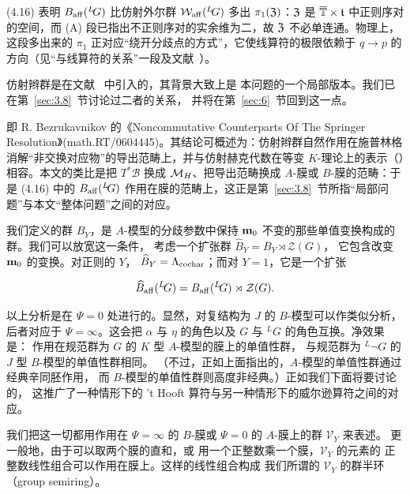 \begin{yizhu}[易错点](4.16) 表明 $B_{\rm aff}({}^L\neg G)$ 比仿射外尔群 $\AffWeyl({}^L\neg G)$ 多出 $\pi_1(\eurz)$：$\eurz$ 是 $\bar\TT\times\mathfrak t$ 中正则序对的空间，而 (A) 段已指出不正则序对的实余维为二，故 $\eurz$ 不必单连通。物理上，这段多出来的 $\pi_1$ 正对应“绕开分歧点的方式”，它使线算符的极限依赖于 $q\to p$ 的方向（见“与线算符的关系”一段及文献~\cite{ref75}）。\end{yizhu}

仿射辫群是在文献~\cite{ref29} 中引入的，其背景大致上是
本问题的一个局部版本。我们已在第~\ref{sec:3.8}~节讨论过二者的关系，
并将在第~\ref{sec:6}~节回到这一点。

\begin{yizhu}[含糊点拨]\cite{ref29} 即 R. Bezrukavnikov 的《Noncommutative Counterparts Of The Springer Resolution》(math.RT/0604445)。其结论可概述为：仿射辫群自然作用在施普林格消解“非交换对应物”的导出范畴上，并与仿射赫克代数在等变 $K$-理论上的表示（\cite{ref27,ref28}）相容。本文的类比是把 $T^*\mathcal B$ 换成 $\MH$、把导出范畴换成 $A$-膜或 $B$-膜的范畴：于是 (4.16) 中的 $B_{\rm aff}({}^L\neg G)$ 作用在膜的范畴上，这正是第~\ref{sec:3.8}~节所指“局部问题”与本文“整体问题”之间的对应。\end{yizhu}

我们定义的群 $B_Y$，是 $A$-模型的分歧参数中保持
${\bf m}_0$ 不变的那些单值变换构成的群。我们可以放宽这一条件，
考虑一个扩张群 $\hat B_Y=B_Y\rtimes {\mathcal Z}(G)$，
它包含改变 ${\bf m}_0$ 的变换。对正则的 $Y$，
$\hat{B}_Y=\Lambda_\cochar$；而对 $Y=1$，它是一个扩张

\setcounter{equation}{16}
\begin{equation}\label{eq:4.17}
  \hat{B}_{\rm aff}({}^L\neg G)= B_{\rm aff}(^L\neg
G)\rtimes {\mathcal Z}(G).
\end{equation}


以上分析是在 $\Psi=0$ 处进行的。显然，对复结构为 $J$
的 $B$-模型可以作类似分析，后者对应于 $\Psi=\infty$。这会把
$\alpha$ 与 $\eta$ 的角色以及 $G$ 与 $^LG$ 的角色互换。净效果是：
作用在规范群为 $G$ 的 $K$ 型 $A$-模型的膜上的单值性群，
与规范群为 $^L\neg G$ 的 $J$ 型 $B$-模型的单值性群相同。
（不过，正如上面指出的，$A$-模型的单值性群通过经典辛同胚作用，
而 $B$-模型的单值性群则高度非经典。）正如我们下面将要讨论的，
这推广了一种情形下的 't Hooft 算符与另一种情形下的威尔逊算符之间的对应。

\bigskip{}

我们把这一切都用作用在 $\Psi=\infty$ 的 $B$-膜或 $\Psi=0$ 的
$A$-膜上的群 ${\mathcal V}_Y$ 来表述。
更一般地，由于可以取两个膜的直和，或
用一个正整数乘一个膜，$\mathcal V_Y$ 的元素的
正整数线性组合可以作用在膜上。这样的线性组合构成
我们所谓的 $\mathcal V_Y$ 的群半环（group semiring）。

